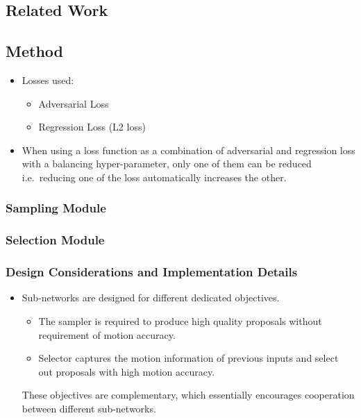 \documentclass{article}
\begin{document}
    \subsection{Related Work}\label{subsec:Video_Prediction_via_Selective_Sampling_(VPSS)_(2018_NIPS):related-work}

    \subsection{Method}\label{subsec:Video_Prediction_via_Selective_Sampling_(VPSS)_(2018_NIPS):method}
    \begin{itemize}
        \item Losses used:
        \begin{itemize}
            \item Adversarial Loss
            \item Regression Loss (L2 loss)
        \end{itemize}
        \item When using a loss function as a combination of adversarial and regression loss with a balancing hyper-parameter, only one of them can be reduced i.e.\ reducing one of the loss automatically increases the other.
    \end{itemize}

    \subsubsection{Sampling Module}\label{subsubsec:Video_Prediction_via_Selective_Sampling_(VPSS)_(2018_NIPS):sampling-module}

    \subsubsection{Selection Module}\label{subsubsec:Video_Prediction_via_Selective_Sampling_(VPSS)_(2018_NIPS):selection-module}

    \subsubsection{Design Considerations and Implementation Details}\label{subsubsec:Video_Prediction_via_Selective_Sampling_(VPSS)_(2018_NIPS):design-considerations-and-implementation-details}
    \begin{itemize}
        \item Sub-networks are designed for different dedicated objectives.
        \begin{itemize}
            \item The sampler is required to produce high quality proposals without requirement of motion accuracy.
            \item Selector captures the motion information of previous inputs and select out proposals with high motion accuracy.
        \end{itemize}
        These objectives are complementary, which essentially encourages cooperation between different sub-networks.
    \end{itemize}
\end{document}

